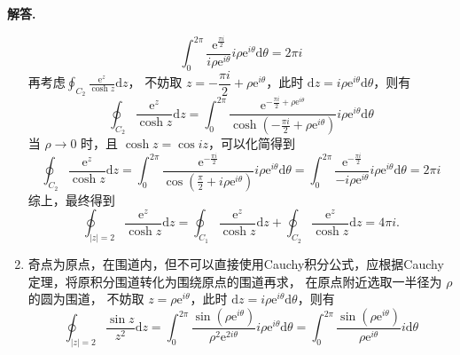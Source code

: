 \documentclass[11pt]{ctexart}
\newenvironment{solution}{\par\noindent\textbf{解答. }}{\par}
\begin{document}
\begin{solution}
\begin{enumerate}[(1)]
\begin{equation*}
                \int_{0}^{2\pi}\frac{\text{e}^{\frac{\pi i}{2}}}{i\rho\text{e}^{i\theta}}i\rho\text{e}^{i\theta}\text{d}\theta =
                2\pi i
              \end{equation*}
              再考虑$\displaystyle\oint_{C_2} \frac{\text{e}^z}{\cosh{z}}\text{d}z$，
              不妨取 $z=-\dfrac{\pi i}{2}+\rho\text{e}^{i\theta}$，此时 $\text{d}z=i\rho\text{e}^{i\theta}\text{d}\theta$，则有
              \begin{equation*}
                \oint_{C_2} \frac{\text{e}^z}{\cosh{z}}\text{d}z = 
                \int_{0}^{2\pi}\frac{\text{e}^{-\frac{\pi i}{2}+\rho\text{e}^{i\theta}}}{\cosh{(-\frac{\pi i}{2}+\rho\text{e}^{i\theta})}}i\rho\text{e}^{i\theta}\text{d}\theta
              \end{equation*}
              当 $\rho\to0$ 时，且 $\cosh{z}=\cos{iz}$，可以化简得到
              \begin{equation*}
                \oint_{C_2} \frac{\text{e}^z}{\cosh{z}}\text{d}z = 
                \int_{0}^{2\pi}\frac{\text{e}^{-\frac{\pi i}{2}}}{\cos{(\frac{\pi}{2}+i\rho\text{e}^{i\theta})}}i\rho\text{e}^{i\theta}\text{d}\theta = 
                \int_{0}^{2\pi}\frac{\text{e}^{-\frac{\pi i}{2}}}{-i\rho\text{e}^{i\theta}}i\rho\text{e}^{i\theta}\text{d}\theta =
                2\pi i
              \end{equation*}
              综上，最终得到
              \begin{equation*}
                \oint_{\left|z\right|=2} \frac{\text{e}^z}{\cosh{z}}\text{d}z =
                \oint_{C_1} \frac{\text{e}^z}{\cosh{z}}\text{d}z + 
                \oint_{C_2} \frac{\text{e}^z}{\cosh{z}}\text{d}z = 
                4\pi i.
              \end{equation*}
        \item 奇点为原点，在围道内，但不可以直接使用Cauchy积分公式，应根据Cauchy定理，将原积分围道转化为围绕原点的围道再求，
              在原点附近选取一半径为 $\rho$ 的圆为围道，
              不妨取 $z=\rho\text{e}^{i\theta}$，此时 $\text{d}z=i\rho\text{e}^{i\theta}\text{d}\theta$，则有
              \begin{equation*}
                \oint_{\left|z\right|=2} \frac{\sin{z}}{z^2}\text{d}z = 
                \int_{0}^{2\pi}\frac{\sin{(\rho\text{e}^{i\theta})}}{\rho^2\text{e}^{2i\theta}}i\rho\text{e}^{i\theta}\text{d}\theta = 
                \int_{0}^{2\pi}\frac{\sin{(\rho\text{e}^{i\theta})}}{\rho\text{e}^{i\theta}}i\text{d}\theta
              \end{equation*}

\end{enumerate}
\end{solution}
\end{document}
